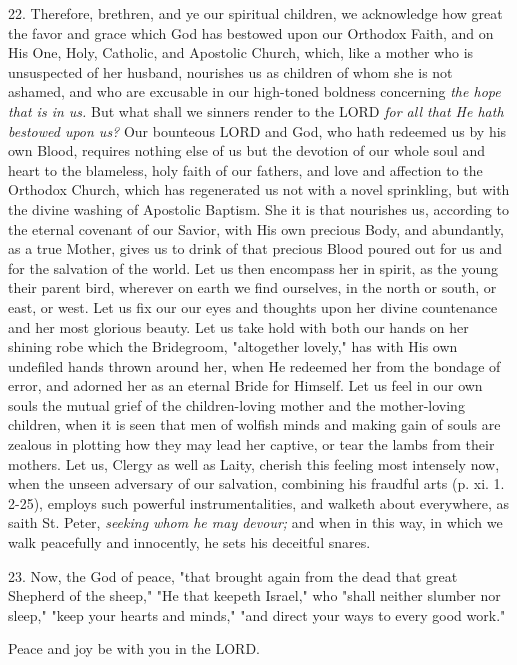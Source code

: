 22. Therefore, brethren, and ye our spiritual children, we acknowledge
how great the favor and grace which God has bestowed upon our Orthodox
Faith, and on His One, Holy, Catholic, and Apostolic Church, which, like
a mother who is unsuspected of her husband, nourishes us as children of
whom she is not ashamed, and who are excusable in our high-toned
boldness concerning \emph{the hope that is in us.} But what shall we
sinners render to the LORD \emph{for all that He hath bestowed upon us?}
Our bounteous LORD and God, who hath redeemed us by his own Blood,
requires nothing else of us but the devotion of our whole soul and heart
to the blameless, holy faith of our fathers, and love and affection to
the Orthodox Church, which has regenerated us not with a novel
sprinkling, but with the divine washing of Apostolic Baptism. She it is
that nourishes us, according to the eternal covenant of our Savior, with
His own precious Body, and abundantly, as a true Mother, gives us to
drink of that precious Blood poured out for us and for the salvation of
the world. Let us then encompass her in spirit, as the young their
parent bird, wherever on earth we find ourselves, in the north or south,
or east, or west. Let us fix our our eyes and thoughts upon her divine
countenance and her most glorious beauty. Let us take hold with both our
hands on her shining robe which the Bridegroom, "altogether lovely," has
with His own undefiled hands thrown around her, when He redeemed her
from the bondage of error, and adorned her as an eternal Bride for
Himself. Let us feel in our own souls the mutual grief of the
children-loving mother and the mother-loving children, when it is seen
that men of wolfish minds and making gain of souls are zealous in
plotting how they may lead her captive, or tear the lambs from their
mothers. Let us, Clergy as well as Laity, cherish this feeling most
intensely now, when the unseen adversary of our salvation, combining his
fraudful arts (p. xi. 1. 2-25), employs such powerful instrumentalities,
and walketh about everywhere, as saith St. Peter, \emph{seeking whom he
may devour;} and when in this way, in which we walk peacefully and
innocently, he sets his deceitful snares.

23. Now, the God of peace, "that brought again from the dead that great
Shepherd of the sheep," "He that keepeth Israel," who "shall neither
slumber nor sleep," "keep your hearts and minds," "and direct your ways
to every good work."

Peace and joy be with you in the LORD.

